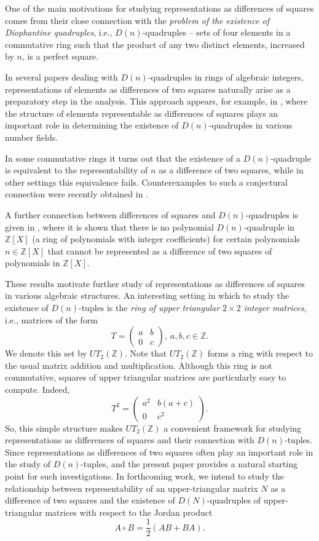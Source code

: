 \documentclass[11pt]{amsart}
\def\Z{\mathbb{Z}}
\begin{document}
One of the main motivations for studying representations as differences of squares comes from their close connection with the \textit{problem of the existence of Diophantine quadruples}, i.e., $D(n)$-quadruples -- sets of four elements in a commutative ring such that the product of any two distinct elements, increased by $n$, is a perfect square.

In several papers dealing with $D(n)$-quadruples in rings of algebraic integers, representations of elements as differences of two squares naturally arise as a preparatory step in the analysis. This approach appears, for example, in  \cite{zr-mis,zr-soldo,zr-borka,ljerka}, where the structure of elements representable as differences of squares plays an important role in determining the existence of $D(n)$-quadruples in various number fields.

In some commutative rings it turns out that the existence of a $D(n)$-quadruple is equivalent to the representability of $n$ as a difference of two squares, while in other settings this equivalence fails. Counterexamples to such a conjectural connection were recently obtained in \cite{cgh,cgh2,gup}. 

A further connection between differences of squares and $D(n)$-quadruples is given in \cite{az}, where it is shown that there is no polynomial $D(n)$-quadruple in $\Z[X]$ (a ring of polynomials with integer coefficients) for certain polynomials $n\in \Z[X]$ that cannot be represented as a difference of two squares of polynomials in $\Z[X]$.

These results motivate further study of representations as differences of squares in various algebraic structures. An interesting setting in which to study the existence of $D(n)$-tuples is the \textit{ring of upper triangular $2\times 2$ integer matrices}, i.e., matrices of the form
$$ T=\begin{pmatrix}a&b\\0&c\end{pmatrix},~ a,b,c\in\Z.$$
We denote this set by $UT_2(\Z)$. Note that $UT_2(\Z)$ forms a ring with respect to the usual matrix addition and multiplication. Although this ring is not commutative, squares of upper triangular matrices are particularly easy to compute. Indeed,
$$ T^2=\begin{pmatrix}a^2&b(a+c)\\0&c^2\end{pmatrix}.$$
So, this simple structure makes  $UT_2(\Z)$ a convenient framework for studying representations as differences of squares and their connection with $D(n)$-tuples.  Since representations as differences of two squares often play an important role in the study of $D(n)$-tuples, and the present paper provides a natural starting point for such investigations.  In forthcoming work, we intend to study the relationship between representability of an upper-triangular matrix $N$ as a difference of two squares and the existence of $D(N)$-quadruples of upper-triangular matrices with respect to the Jordan product
$$ A\circ B=\frac12(AB+BA).$$
\end{document}
